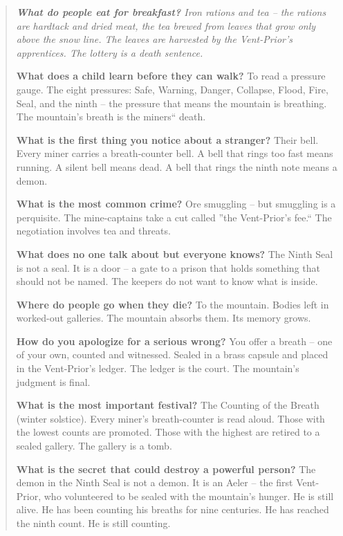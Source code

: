 \documentclass[12pt,oneside]{book}
\newenvironment{almanac}
  {\begin{quote}\small\itshape}
  {\end{quote}}
\begin{document}
\vspace{1em}
\begin{almanac}
\textbf{What do people eat for breakfast?} Iron rations and tea -- the rations are hardtack and dried meat, the tea brewed from leaves that grow only above the snow line. The leaves are harvested by the Vent-Prior's apprentices. The lottery is a death sentence.

\textbf{What does a child learn before they can walk?} To read a pressure gauge. The eight pressures: Safe, Warning, Danger, Collapse, Flood, Fire, Seal, and the ninth -- the pressure that means the mountain is breathing. The mountain's breath is the miners`` death.

\textbf{What is the first thing you notice about a stranger?} Their bell. Every miner carries a breath-counter bell. A bell that rings too fast means running. A silent bell means dead. A bell that rings the ninth note means a demon.

\textbf{What is the most common crime?} Ore smuggling -- but smuggling is a perquisite. The mine-captains take a cut called ''the Vent-Prior's fee.`` The negotiation involves tea and threats.

\textbf{What does no one talk about but everyone knows?} The Ninth Seal is not a seal. It is a door -- a gate to a prison that holds something that should not be named. The keepers do not want to know what is inside.

\textbf{Where do people go when they die?} To the mountain. Bodies left in worked-out galleries. The mountain absorbs them. Its memory grows.

\textbf{How do you apologize for a serious wrong?} You offer a breath -- one of your own, counted and witnessed. Sealed in a brass capsule and placed in the Vent-Prior's ledger. The ledger is the court. The mountain's judgment is final.

\textbf{What is the most important festival?} The Counting of the Breath (winter solstice). Every miner's breath-counter is read aloud. Those with the lowest counts are promoted. Those with the highest are retired to a sealed gallery. The gallery is a tomb.

\textbf{What is the secret that could destroy a powerful person?} The demon in the Ninth Seal is not a demon. It is an Aeler -- the first Vent-Prior, who volunteered to be sealed with the mountain's hunger. He is still alive. He has been counting his breaths for nine centuries. He has reached the ninth count. He is still counting.
\end{almanac}
\end{document}
